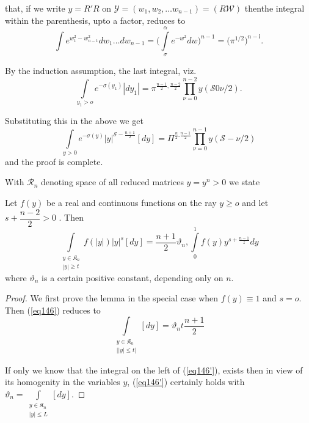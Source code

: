 that, if we write $y = R' R$ on $\mathscr{Y} = ( w_1, w_2, \ldots
w_{n-1}) = (R \mathscr{W})$ 
then\pageoriginale  the integral within the parenthesis, upto a
factor, reduces to   
$$
\int e^{w_1^2 - w_{n - 1}^2} d w_1 \ldots d w_{n-1} = \bigg(
\int\limits_\sigma^\alpha e^{- w^2} d w  \bigg)^{n -1} = \bigg(
\pi^{1/2}\bigg)^{n-l}. 
$$

By the induction assumption, the last integral, viz.
$$
\int\limits_{y_1 > o} e^{- \sigma (y_1)} | d y_1| = \pi^{\frac{n-1}{2}
  , \frac{n-2}{2}} \prod_{\nu = 0}  ^{n-2} y ( \mathcal{S} 0 \nu
/ 2) .  
$$

Substituting this in the above we get 
$$
\int\limits_{ y > 0} e^{- \sigma (y)} | y |^{\mathcal{S} - \frac{n +
    1}{2}} [ d y ] = \Pi ^{ \frac{n}{2}. \frac{n - 1}{2}}
\prod^{n-1}_{\nu = 0} y (\mathcal{S} - \nu / 2) 
$$
and the proof is complete. 

With $\mathscr{R}_n$ denoting space of all reduced matrices $ y =
y ^{n} > 0$ we state  

\begin{lem}\label{chap8:lem15} %
Let $f(y)$ be a real and continuous functions on the ray $y \geq o
  $ and let $ s + \dfrac{n -2}{2} > 0$ . Then  
\begin{equation*}
\int\limits_{\substack{y \in \mathfrak{K}_n \\ |y| \geq t }}
f (| y |) | y|^s [ d y ] =  \frac{n + 1}{2} \vartheta_n
, \int\limits_0^1 f(y) y^{s + \frac{n - 1}{z}} dy \tag{146}\label{eq146}   
\end{equation*}
where $\vartheta_n$ is a certain positive constant, depending only on
$n$.  
\end{lem}


\begin{proof}%
We first prove the lemma in the special case when $f (y ) \equiv 1$
and $s = o$. Then (\ref{eq146}) reduces to  
\begin{equation*}
\int\limits_{\substack{y \in \mathfrak{K}_n\\ ||y | \leq t|}
} [d y] = \vartheta _n t\frac{n + 1}{2} \tag*{$(146)'$}\label{eq146'}   
\end{equation*}

If only we know that the integral on the left of (\ref{eq146'}), exists then
in view of its homogenity in the variables $y$, (\ref{eq146'}) certainly
holds with $\vartheta_n = \int\limits_{\substack{y \in
    \mathfrak{K}_n \\ |y| \leq L}} [dy]$.  
\end{proof}

